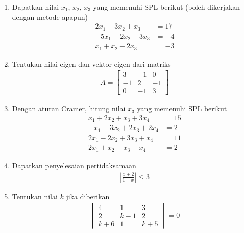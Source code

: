 \documentclass[10pt,openany,a4paper]{article}
\theoremstyle{definition}
\theoremstyle{definition}
\theoremstyle{plain}
\begin{document}
\begin{enumerate}
    \item Dapatkan nilai $x_1$, $x_2$, $x_3$ yang memenuhi SPL berikut (boleh dikerjakan dengan metode apapun)
    \begin{align*}
        2x_1+3x_2+x_3 &= 17\\
        -5x_1-2x_2+3x_3 &= -4\\
        x_1+x_2-2x_3 &= -3
    \end{align*}

    \item Tentukan nilai eigen dan vektor eigen dari matriks
    \begin{align*}
        A=\begin{bmatrix}
            3 & -1 & 0\\
            -1 & 2 & -1\\
            0 & -1 & 3
        \end{bmatrix}
    \end{align*}

    \item Dengan aturan Cramer, hitung nilai $x_3$ yang memenuhi SPL berikut
    \begin{align*}
        x_1+2x_2+x_3+3x_4 &= 15\\
        -x_1-3x_2+2x_3+2x_4 &= 2\\
        2x_1-2x_2+3x_3+x_4 &= 11\\
        2x_1+x_2-x_3-x_4 &= 2
    \end{align*}

    \item Dapatkan penyelesaian pertidaksamaan
    \begin{align*}
        \left|\frac{x+2}{1-x}\right|\leq 3
    \end{align*}

    \item Tentukan nilai $k$ jika diberikan
    \begin{align*}
        \begin{vmatrix}
            4 & 1 & 3\\
            2 & k-1 & 2\\
            k+6 & 1 & k+5
        \end{vmatrix}=0
    \end{align*}
\end{enumerate}

\newpage 


\end{document}
